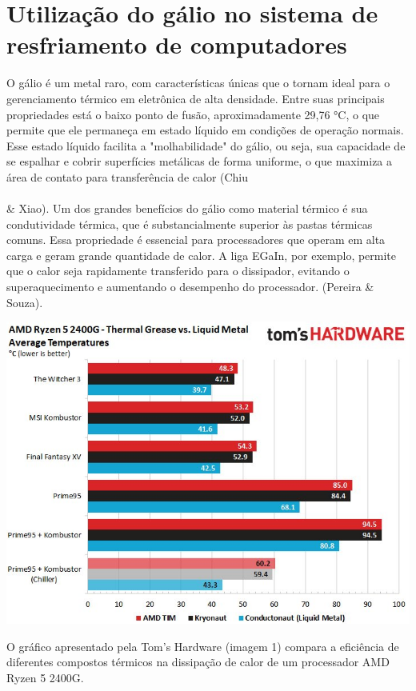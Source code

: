 \documentclass[12pt]{article}
\begin{document}
\section{Utilização do gálio no sistema de resfriamento de computadores}
O gálio é um metal raro, com características únicas que o tornam ideal para o gerenciamento térmico em eletrônica de alta densidade. Entre suas principais propriedades está o baixo ponto de fusão, aproximadamente 29,76 °C, o que permite que ele permaneça em estado líquido em condições de operação normais. Esse estado líquido facilita a "molhabilidade" do gálio, ou seja, sua capacidade de se espalhar e cobrir superfícies metálicas de forma uniforme, o que maximiza a área de contato para transferência de calor (Chiu \\\\\& Xiao).
Um dos grandes benefícios do gálio como material térmico é sua condutividade térmica, que é substancialmente superior às pastas térmicas comuns. Essa propriedade é essencial para processadores que operam em alta carga e geram grande quantidade de calor. A liga EGaIn, por exemplo, permite que o calor seja rapidamente transferido para o dissipador, evitando o superaquecimento e aumentando o desempenho do processador. (Pereira \& Souza).
\begin{adjustbox}{center,caption={Grafico Comparativo entre Pasta térmica e Metal liquido (Imagem: Tom's Hardware)},nofloat=figure,vspace=\bigskipamount}
    \includegraphics[width=15cm]{tio_hardware.jpg}
\end{adjustbox}
O gráfico apresentado pela Tom's Hardware (imagem 1) compara a eficiência de diferentes compostos térmicos na dissipação de calor de um processador AMD Ryzen 5 2400G. 
\end{document}
